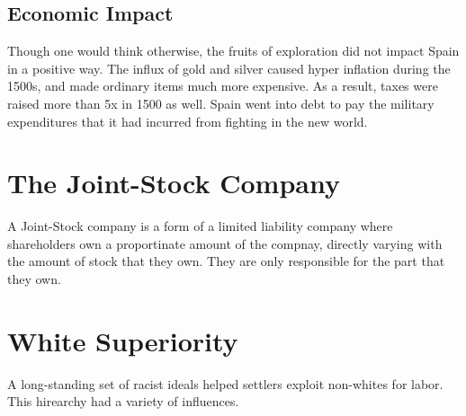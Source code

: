 \subsection{Economic Impact}
Though one would think otherwise, the fruits of exploration did not impact Spain
in a positive way.  The influx of gold and silver caused hyper inflation during
the 1500s, and made ordinary items much more expensive.  As a result, taxes were
raised more than 5x in 1500 as well.  Spain went into debt to pay the military
expenditures that it had incurred from fighting in the new world.

\section{The Joint-Stock Company}
A Joint-Stock company is a form of a limited liability company where
shareholders own a proportinate amount of the compnay, directly varying with the
amount of stock that they own.  They are only responsible for the part that they
own.

\section{White Superiority}
A long-standing set of racist ideals helped settlers exploit non-whites for
labor.  This hirearchy had a variety of influences.
